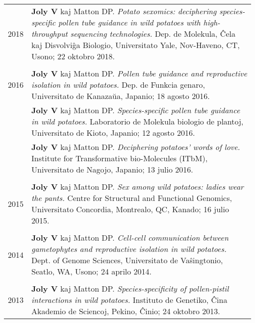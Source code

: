 \documentclass[letterpaper,12pt]{article}
\begin{document}
\begin{tabularx}{\textwidth}{@{}r|X@{}}

2018
& \textbf{Joly V} kaj Matton DP.
  \emph{Potato sexomics: deciphering species-specific pollen tube guidance in
  wild potatoes with high-throughput sequencing technologies.}
  Dep. de Molekula, Ĉela kaj Disvolviĝa Biologio,
  Universitato Yale, Nov-Haveno, CT, Usono;
  22 oktobro 2018.
  \\

\multicolumn{2}{c}{} \\

2016
& \textbf{Joly V} kaj Matton DP.
  \emph{Pollen tube guidance and reproductive isolation in wild potatoes.}
  Dep. de Funkcia genaro,
  Universitato de Kanazaŭa, Japanio;
  18 agosto 2016.
  \vspace{1.5mm}
  \\

& \textbf{Joly V} kaj Matton DP.
  \emph{Species-specific pollen tube guidance in wild potatoes.}
  Laboratorio de Molekula biologio de plantoj,
  Universitato de Kioto, Japanio;
  12 agosto 2016.
  \vspace{1.5mm}
  \\

& \textbf{Joly V} kaj Matton DP.
  \emph{Deciphering potatoes’ words of love.}
  Institute for Transformative bio-Molecules (ITbM),
  Universitato de Nagojo, Japanio;
  13 julio 2016.
  \\

\multicolumn{2}{c}{} \\

2015
& \textbf{Joly V} kaj Matton DP.
  \emph{Sex among wild potatoes: ladies wear the pants.}
  Centre for Structural and Functional Genomics,
  Universitato Concordia, Montrealo, QC, Kanado;
  16 julio 2015.
  \\

\multicolumn{2}{c}{} \\

2014
& \textbf{Joly V} kaj Matton DP.
  \emph{Cell-cell communication between gametophytes and reproductive isolation
  in wild potatoes.}
  Dept. of Genome Sciences, Universitato de Vaŝingtonio, Seatlo, WA, Usono;
  24 aprilo 2014.
  \\

\multicolumn{2}{c}{} \\

2013
& \textbf{Joly V} kaj Matton DP.
  \emph{Species-specificity of pollen-pistil interactions in wild potatoes.}
  Instituto de Genetiko, Ĉina Akademio de Sciencoj, Pekino, Ĉinio;
  24 oktobro 2013. 
  \\

\end{tabularx}
\end{document}
